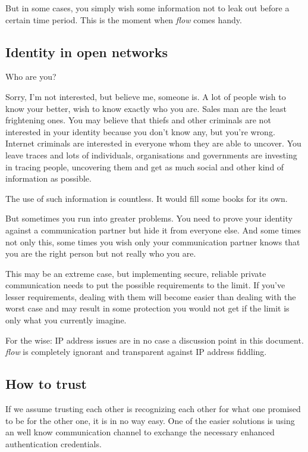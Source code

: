 \documentclass[twoside,a4paper,english,12pt,authoryear,openright]{book}
\newcommand{\flow}{\textit{flow} }
\begin{document}
But in some cases, you simply wish some information not to leak out before a certain time period. This is the moment when \flow comes handy.


\subsection{Identity in open networks}

Who are you?

Sorry, I'm not interested, but believe me, someone is. A lot of people wish to know your better, wish to know exactly who you are. Sales man are the least frightening ones. You may believe that thiefs and other criminals are not interested in your identity because you don't know any, but you're wrong. Internet criminals are interested in everyone whom they are able to uncover. You leave traces and lots of individuals, organisations and governments are investing in tracing people, uncovering them and get as much social and other kind of information as possible.

The use of such information is countless. It would fill some books for its own.

But sometimes you run into greater problems. You need to prove your identity against a communication partner but hide it from everyone else. And some times not only this, some times you wish only your communication partner knows that you are the right person but not really who you are.

This may be an extreme case, but implementing secure, reliable private communication needs to put the possible requirements to the limit. If you've lesser requirements, dealing with them will become easier than dealing with the worst case and may result in some protection you would not get if the limit is only what you currently imagine.

For the wise: IP address issues are in no case a discussion point in this document. \flow is completely ignorant and transparent against IP address fiddling.


\subsection{How to trust}

If we assume trusting each other is recognizing each other for what one promised to be for the other one, it is in no way easy. One of the easier solutions is using an well know communication channel to exchange the necessary enhanced authentication credentials.
\end{document}
